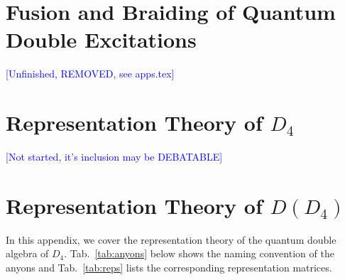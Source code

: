 \documentclass[two column]{article}
\newcommand{\jovan}[1]{\textcolor{blue}{[#1]}}
\begin{document}
\section{Fusion and Braiding of Quantum Double Excitations}\label{app:fusion}\label{app:braid}
\jovan{Unfinished, REMOVED, see apps.tex}

\section{Representation Theory of $D_4$} \label{app:D4asgroup}
\jovan{Not started, it's inclusion may be DEBATABLE}

\section{Representation Theory of $D(D_4)$}\label{app:reps}

In this appendix, we cover the representation theory of the quantum double algebra of $D_4$. Tab.~\ref{tab:anyons} below shows the naming convention of the anyons and Tab.~\ref{tab:reps} lists the corresponding representation matrices. 
\end{document}
